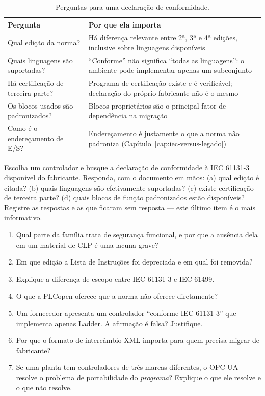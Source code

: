 \begin{table}[H]
  \centering
  \caption{Perguntas para uma declaração de conformidade.}
  \label{tab:conformidade}
  \begin{tabular}{p{4.6cm} p{10.0cm}}
    \toprule
    Pergunta & Por que ela importa \\
    \midrule
    Qual edição da norma? & Há diferença relevante entre 2ª, 3ª e 4ª edições, inclusive sobre
      linguagens disponíveis \\
    Quais linguagens são suportadas? & ``Conforme'' não significa ``todas as linguagens'': o
      ambiente pode implementar apenas um subconjunto \\
    Há certificação de terceira parte? & Programa de certificação existe e é verificável; declaração
      do próprio fabricante não é o mesmo \\
    Os blocos usados são padronizados? & Blocos proprietários são o principal fator de dependência
      na migração \\
    Como é o endereçamento de E/S? & Endereçamento é justamente o que a norma não padroniza
      (Capítulo~\ref{cap:iec-versus-legado}) \\
    \bottomrule
  \end{tabular}
\end{table}

\begin{pratica}
Escolha um controlador e busque a declaração de conformidade à IEC 61131-3 disponível do fabricante.
Responda, com o documento em mãos:
(a) qual edição é citada?
(b) quais linguagens são efetivamente suportadas?
(c) existe certificação de terceira parte?
(d) quais blocos de função padronizados estão disponíveis?
Registre as respostas e as que ficaram sem resposta --- este último item é o mais informativo.
\end{pratica}

\begin{exercicios}
\begin{enumerate}[label=\alph*)]
  \item Qual parte da família trata de segurança funcional, e por que a ausência dela em um material
        de CLP é uma lacuna grave?
  \item Em que edição a Lista de Instruções foi depreciada e em qual foi removida?
  \item Explique a diferença de escopo entre IEC 61131-3 e IEC 61499.
  \item O que a PLCopen oferece que a norma não oferece diretamente?
  \item Um fornecedor apresenta um controlador ``conforme IEC 61131-3'' que implementa apenas Ladder.
        A afirmação é falsa? Justifique.
  \item Por que o formato de intercâmbio XML importa para quem precisa migrar de fabricante?
  \item Se uma planta tem controladores de três marcas diferentes, o OPC UA resolve o problema de
        portabilidade do \emph{programa}? Explique o que ele resolve e o que não resolve.
\end{enumerate}
\end{exercicios}
